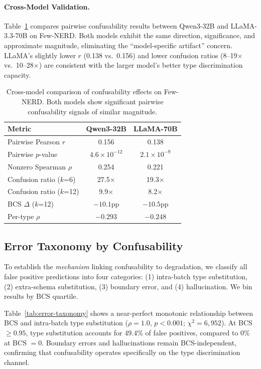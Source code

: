 \documentclass[11pt,a4paper]{article}
\begin{document}
\paragraph{Cross-Model Validation.}
Table~\ref{tab:cross-model} compares pairwise confusability results between Qwen3-32B and LLaMA-3.3-70B on Few-NERD. Both models exhibit the same direction, significance, and approximate magnitude, eliminating the ``model-specific artifact'' concern. LLaMA's slightly lower $r$ (0.138 vs.\ 0.156) and lower confusion ratios (8--19$\times$ vs.\ 10--28$\times$) are consistent with the larger model's better type discrimination capacity.

\begin{table}[t]
\centering
\small
\begin{tabular}{lcc}
\toprule
Metric & Qwen3-32B & LLaMA-70B \\
\midrule
Pairwise Pearson $r$     & 0.156 & 0.138 \\
Pairwise $p$-value       & $4.6 \times 10^{-12}$ & $2.1 \times 10^{-9}$ \\
Nonzero Spearman $\rho$  & 0.254 & 0.221 \\
Confusion ratio ($k$=6)  & 27.5$\times$ & 19.3$\times$ \\
Confusion ratio ($k$=12) & 9.9$\times$  & 8.2$\times$ \\
BCS $\Delta$ ($k$=12)    & $-10.1$pp & $-10.5$pp \\
Per-type $\rho$           & $-0.293$ & $-0.248$ \\
\bottomrule
\end{tabular}
\caption{Cross-model comparison of confusability effects on Few-NERD. Both models show significant pairwise confusability signals of similar magnitude.}
\label{tab:cross-model}
\end{table}

\subsection{Error Taxonomy by Confusability}

To establish the \emph{mechanism} linking confusability to degradation, we classify all false positive predictions into four categories: (1) intra-batch type substitution, (2) extra-schema substitution, (3) boundary error, and (4) hallucination. We bin results by BCS quartile.

Table~\ref{tab:error-taxonomy} shows a near-perfect monotonic relationship between BCS and intra-batch type substitution ($\rho = 1.0$, $p < 0.001$; $\chi^2 = 6{,}952$). At BCS $\geq 0.95$, type substitution accounts for 49.4\% of false positives, compared to 0\% at BCS $= 0$. Boundary errors and hallucinations remain BCS-independent, confirming that confusability operates specifically on the type discrimination channel.
\end{document}
